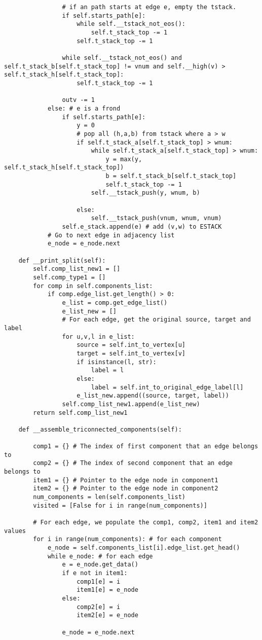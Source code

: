 \begin{center}
\begin{verbatim}
				# if an path starts at edge e, empty the tstack.
				if self.starts_path[e]:
					while self.__tstack_not_eos():
						self.t_stack_top -= 1
					self.t_stack_top -= 1

				while self.__tstack_not_eos() and self.t_stack_b[self.t_stack_top] != vnum and self.__high(v) > self.t_stack_h[self.t_stack_top]:
					self.t_stack_top -= 1

				outv -= 1
			else: # e is a frond
				if self.starts_path[e]:
					y = 0
					# pop all (h,a,b) from tstack where a > w
					if self.t_stack_a[self.t_stack_top] > wnum:
						while self.t_stack_a[self.t_stack_top] > wnum:
							y = max(y, self.t_stack_h[self.t_stack_top])
							b = self.t_stack_b[self.t_stack_top]
							self.t_stack_top -= 1
						self.__tstack_push(y, wnum, b)

					else:
						self.__tstack_push(vnum, wnum, vnum)
				self.e_stack.append(e) # add (v,w) to ESTACK
			# Go to next edge in adjacency list
			e_node = e_node.next

	def __print_split(self):
		self.comp_list_new1 = []
		self.comp_type1 = []
		for comp in self.components_list:
			if comp.edge_list.get_length() > 0:
				e_list = comp.get_edge_list()
				e_list_new = []
				# For each edge, get the original source, target and label
				for u,v,l in e_list:
					source = self.int_to_vertex[u]
					target = self.int_to_vertex[v]
					if isinstance(l, str):
						label = l
					else:
						label = self.int_to_original_edge_label[l]
					e_list_new.append((source, target, label))
				self.comp_list_new1.append(e_list_new)
		return self.comp_list_new1

	def __assemble_triconnected_components(self):

		comp1 = {} # The index of first component that an edge belongs to
		comp2 = {} # The index of second component that an edge belongs to
		item1 = {} # Pointer to the edge node in component1
		item2 = {} # Pointer to the edge node in component2
		num_components = len(self.components_list)
		visited = [False for i in range(num_components)]

		# For each edge, we populate the comp1, comp2, item1 and item2 values
		for i in range(num_components): # for each component
			e_node = self.components_list[i].edge_list.get_head()
			while e_node: # for each edge
				e = e_node.get_data()
				if e not in item1:
					comp1[e] = i
					item1[e] = e_node
				else:
					comp2[e] = i
					item2[e] = e_node

				e_node = e_node.next


\end{verbatim}
\end{center}
